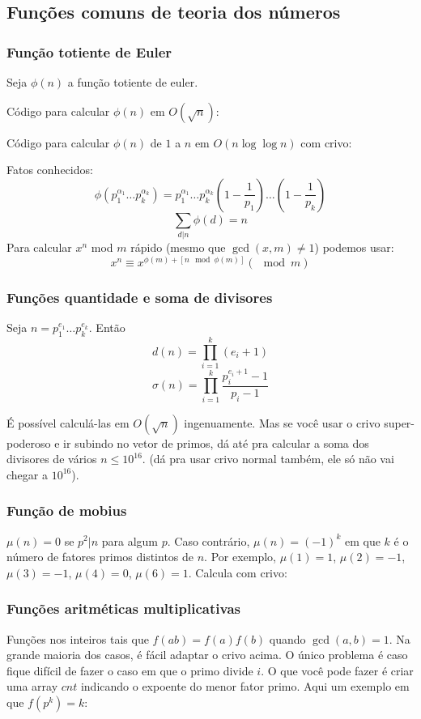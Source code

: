 \subsection{Funções comuns de teoria dos números}

\subsubsection{Função totiente de Euler}

Seja $\phi(n)$ a função totiente de euler.

Código para calcular $\phi(n)$ em $O(\sqrt{n})$:


Código para calcular $\phi(n)$ de $1$ a $n$ em $O(n \log \log n)$ com crivo:


Fatos conhecidos:
$$\phi(p_1^{\alpha_1} \dots p_k^{\alpha_k}) = p_1^{\alpha_1} \dots p_k^{\alpha_k} \left(1 - \dfrac{1}{p_1} \right) \dots \left(1 - \dfrac{1}{p_k} \right) $$
$$\sum\limits_{d | n} \phi(d) = n$$
Para calcular $x^n$ mod $m$ rápido (mesmo que $\gcd(x, m) \neq 1$) podemos usar:
$$x^n \equiv x^{\phi(m) + [n \mod \phi(m)]} ( \mod m)$$

\subsubsection{Funções quantidade e soma de divisores}

Seja $n = p_1^{e_1} \dots p_k^{e_k}$. Então
$$d(n) = \prod\limits_{i=1}^k (e_i+1)$$
$$\sigma(n) = \prod\limits_{i=1}^k \dfrac{p_i^{e_i+1}-1}{p_i-1}$$

É possível calculá-las em $O(\sqrt{n})$ ingenuamente. Mas se você usar o crivo super-poderoso e ir subindo no vetor de primos, dá até pra calcular a soma dos divisores de vários $n \leq 10^{16}$. (dá pra usar crivo normal também, ele só não vai chegar a $10^{16}$).

\subsubsection{Função de mobius}

$\mu(n) = 0$ se $p^2 | n$ para algum $p$. Caso contrário, $\mu(n) = (-1)^k$ em que $k$ é o número de fatores primos distintos de $n$. Por exemplo, $\mu(1) = 1$, $\mu(2) = -1$, $\mu(3) = -1$, $\mu(4) =0$, $\mu(6) = 1$. Calcula com crivo:


\subsubsection{Funções aritméticas multiplicativas}

Funções nos inteiros tais que $f(ab) = f(a)f(b)$ quando $\gcd(a, b) = 1$. Na grande maioria dos casos, é fácil adaptar o crivo acima. O único problema é caso fique difícil de fazer o caso em que o primo divide $i$. O que você pode fazer é criar uma array $cnt$ indicando o expoente do menor fator primo. Aqui um exemplo em que $f(p^k) = k$:

